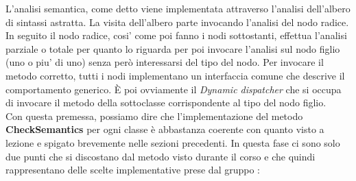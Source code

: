 \documentclass{article}
\begin{document}
L'analisi semantica, come detto viene implementata attraverso l'analisi dell'albero di sintassi astratta. La visita dell'albero parte invocando l'analisi del nodo radice. In seguito il nodo radice, cosi' come poi fanno i nodi sottostanti, effettua l'analisi parziale o totale per quanto lo riguarda per poi invocare l'analisi sul nodo figlio (uno o piu' di uno) senza però interessarsi del tipo del nodo. Per invocare il metodo corretto, tutti i nodi implementano un interfaccia comune che descrive il comportamento generico. È poi ovviamente il \textit{Dynamic dispatcher} che si occupa di invocare il metodo della sottoclasse corrispondente al tipo del nodo figlio. \\
Con questa premessa, possiamo dire che l'implementazione del metodo \textbf{CheckSemantics} per ogni classe è abbastanza coerente con quanto visto a lezione e spigato brevemente nelle sezioni precedenti. In questa fase ci sono solo due punti che si discostano dal metodo visto durante il corso e che quindi rappresentano delle scelte implementative prese dal gruppo :
\end{document}

